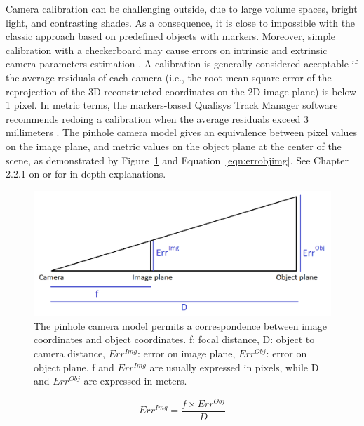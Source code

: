 Camera calibration can be challenging outside, due to large volume spaces, bright light, and contrasting shades. As a consequence, it is close to impossible with the classic approach based on predefined objects with markers. Moreover, simple calibration with a checkerboard may cause errors on intrinsic and extrinsic camera parameters estimation \cite{Sun2005}. A calibration is generally considered acceptable if the average residuals of each camera (i.e., the root mean square error of the reprojection of the 3D reconstructed coordinates on the 2D image plane) is below 1 pixel. In metric terms, the markers-based Qualisys Track Manager software recommends redoing a calibration when the average residuals exceed 3 millimeters \cite{QTM2018}. The pinhole camera model gives an equivalence between pixel values on the image plane, and metric values on the object plane at the center of the scene, as demonstrated by Figure~\ref{fig_pixmeterscorrespondance} and Equation~\ref{eqn:errobjimg}. See Chapter 2.2.1 on  or \cite{Dawson-Howe1994} for in-depth explanations.

\begin{figure}[!ht]
	\centering
	\def\svgwidth{1\columnwidth}
	\fontsize{10pt}{10pt}\selectfont
	\includegraphics[width=\linewidth]{"../Chap4/Figures/Fig_PixelMeterCorrespondance.png"}
	\caption{The pinhole camera model permits a correspondence between image coordinates and object coordinates. f: focal distance, D: object to camera distance, $Err^{Img}$: error on image plane, $Err^{Obj}$: error on object plane. f and $Err^{Img}$ are usually expressed in pixels, while D and $Err^{Obj}$ are expressed in meters.}
	\label{fig_pixmeterscorrespondance}
\end{figure}

\begin{equation}
      Err^{Img} = \frac{f \times Err^{Obj}}{D} 
      \label{eqn:errobjimg}
\end{equation}


